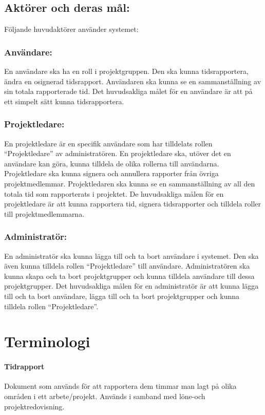 \documentclass[paper=a4, fontsize=11pt,twoside]{article}
\begin{document}
\subsection{Aktörer och deras mål:}
Följande huvudaktörer använder systemet:
\subsubsection{Användare:}
En användare ska ha en roll i projektgruppen. Den ska kunna tidsrapportera, ändra en osignerad tidsrapport. Användaren ska kunna se en sammanställning av sin totala rapporterade tid. Det huvudsakliga målet för en användare är att på ett simpelt sätt kunna tidsrapportera.
\subsubsection{Projektledare:}
En projektledare är en specifik användare som har tilldelats rollen “Projektledare” av administratören. En projektledare ska, utöver det en användare kan göra, kunna tilldela de olika rollerna till användarna. Projektledare ska kunna signera och annullera rapporter från övriga projektmedlemmar. Projektledaren ska kunna se en sammanställning av all den totala tid som rapporterats i projektet. De huvudsakliga målen för en projektledare är att kunna rapportera tid, signera tidsrapporter och tilldela roller till projektmedlemmarna. 
\subsubsection{Administratör:}
En administratör ska kunna lägga till och ta bort användare i systemet. Den ska även kunna tilldela rollen “Projektledare” till användare. Administratören ska kunna skapa och ta bort projektgrupper och kunna tilldela användare till dessa projektgrupper. Det huvudsakliga målen för en administratör är att kunna lägga till och ta bort användare, lägga till och ta bort projektgrupper och kunna tilldela rollen “Projektledare”.

\section{Terminologi}
\paragraph{Tidrapport}
\flushleft
Dokument som används för att rapportera dem timmar man lagt på olika områden i ett arbete/projekt. Används i samband med löne-och projektredovisning.
\end{document}
